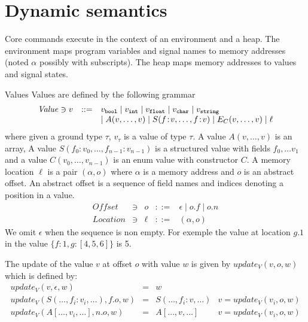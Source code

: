 \documentclass[12pt]{article}
\newcommand{\field}[2]{#1\!:\!#2}
\def\sail{{\sc{sail}}}
\def\integer{{\tt{int}}}
\def\bool{{\tt{bool}}}
\def\float{{\tt{float}}}
\def\char{{\tt{char}}}
\def\str{{\tt{string}}}
\def\emptyoffset{\epsilon}
\def\updateValue{{\mathit{update_V}}}
\begin{document}
\section{Dynamic semantics}
Core \sail{} commands execute in the context of an environment and a heap. The environment maps program
variables and signal names to memory addresses (noted $\alpha$ possibly with subscripts). 
The heap maps memory addresses to values and signal states.
\begin{paragraph}{Values}
Values are defined by the following grammar
$$
\begin{array}{lcl}
{\mathit{Value}} \owns v &::=& v_\bool \mid v_\integer \mid v_\float \mid v_\char \mid v_\str\\
&&\mid A(v,\ldots,v) \mid S(\field{f}{v}, \ldots, \field{f}{v}) \mid E_C(v,\ldots,v) \mid \ell
\end{array}
$$
where given a ground type $\tau$, $v_\tau$ is a value of type $\tau$.
A value $A(v,\ldots,v)$ is an array,
A value $S(\field{f_0}{v_0},\ldots,\field{f_{n-1}}{v_{n-1}})$ is a structured value with fields 
$f_0, \ldots v_1$ and a value $C(v_0,\ldots,v_{n-1})$ is an enum value with constructor $C$. 
A memory location $\ell$ is a pair $(\alpha, o)$ where $\alpha$ is a memory address and 
$o$ is an abstract offset. An abstract offset is a sequence of field names and indices denoting a position 
in a value.
$$
\begin{array}{lclcl}
{\mathit{Offset}} &\owns& o &::=& \emptyoffset \mid o.f \mid o.n\\
{\mathit{Location}} &\owns &\ell &::=& (\alpha, o)
\end{array}
$$
We omit $\epsilon$ when the sequence is non empty.
For exemple the value at location $g.1$ in the value $\{f:1,g:[4,5,6]\}$ is 5.

The update of the value $v$ at offset $o$ with value $w$ is given by  $\updateValue(v,o, w)$ which is defined by:
$$
\begin{array}{lcll}
  \updateValue(v,\epsilon, w) &=& w\\
  \updateValue (S(\ldots, \field{f_i}{v_i}, \ldots),f.o, w) &=& S(\ldots, \field{f_i}{v},\ldots)& v = \updateValue(v_i,o,w)\\
  \updateValue (A[\ldots,v_i,\ldots],n.o,w) &=& A[\ldots, v,\ldots] & v = \updateValue(v_i,o,w)\\
\end{array}
$$
\end{paragraph}
\end{document}
